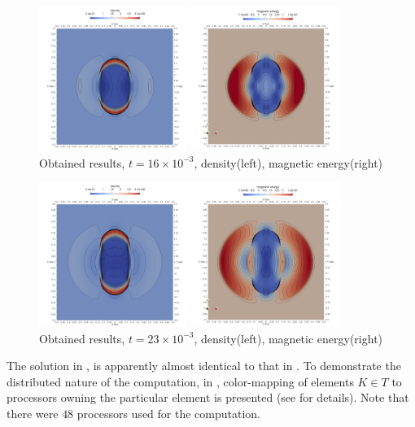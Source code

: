 \begin{figure}[H]
	\begin{center}
		\includegraphics[width=0.87\textwidth]{img/mhd-blast/old/mynew4.jpg}
	\caption{Obtained results, $t = 16\times 10^{-3}$, density(left), magnetic energy(right)}
	\label{figure:blastOldMy4}
	\end{center}
\end{figure}
\vspace{-8mm}

\begin{figure}[H]
	\begin{center}
		\includegraphics[width=0.87\textwidth]{img/mhd-blast/old/mynew5.jpg}
	\caption{Obtained results, $t = 23\times 10^{-3}$, density(left), magnetic energy(right)}
	\label{figure:blastOldMy5}
	\end{center}
\end{figure}
\vspace{-5mm}
The solution in ,   is apparently almost identical to that in . To demonstrate the distributed nature of the computation, in , color-mapping of elements $K \in T$ to processors owning the particular element is presented (see  for details). Note that there were $48$ processors used for the computation.

